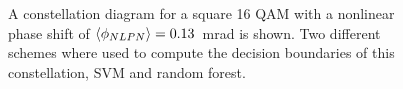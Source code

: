 \begin{figure}[H]
  \centering
  \qquad
  \caption{A constellation diagram for a square 16 QAM with a nonlinear phase shift of $\braket{\phi_{NLPN}}= 0.13$~mrad is shown. Two different schemes where used to compute the decision boundaries of this constellation, SVM and random forest.}                                                                                                                                                                                                                                                                                                                                                                                                                                                                                                                                                                                                                                                                                                                                                                                                                                                                                                                                                                                                                                                                                                                                                                                                                                                                                                                                                                                                                                                                                                                                                                                                                                                                                                                                                                                                                                                                                                                                                                                                                                                                                                                                                                                                                                                                                                                                                                                                                                                                                                                                                                                                                                                                                                                                                                                                                                                                                                     
\end{figure}
